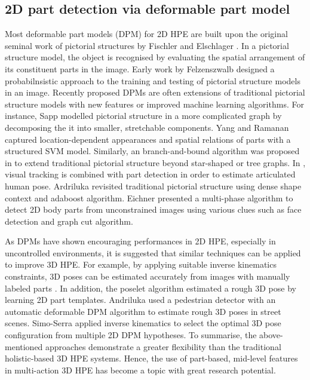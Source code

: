\subsection{2D part detection via deformable part model}  
Most deformable part models (DPM) for 2D HPE are built upon the original seminal work of pictorial structures by Fischler and Elschlager \cite{Fischler1981}. 
In a pictorial structure model, the object is recognised by evaluating the spatial arrangement of its constituent parts in the image. 
Early work by Felzenszwalb \etal \cite{Felzenszwalb2000, Felzenszwalb2005} designed a probabilnsistic approach to the training and testing of pictorial structure models in an image.   
Recently proposed DPMs are often extensions of traditional pictorial structure models with new features or improved machine learning algorithms. 
For instance, Sapp \etal \cite{Sapp2011} modelled pictorial structure in a more complicated graph by decomposing the it into smaller, stretchable components. 
Yang and Ramanan \cite{Yang2011} captured location-dependent appearances and spatial relations of parts with a structured SVM model.   
Similarly, an branch-and-bound algorithm was proposed in \cite{Sun2012a} to extend traditional pictorial structure beyond star-shaped or tree graphs. 
In \cite{Hua2007}, visual tracking is combined with part detection in order to estimate articulated human pose. 
Ardriluka \etal \cite{Andriluka2009} revisited traditional pictorial structure using dense shape context and adaboost algorithm. 
Eichner \etal \cite{Eichner2012} presented a multi-phase algorithm to detect 2D body parts from unconstrained images using various clues such as face detection and graph cut algorithm. 

As DPMs have shown encouraging performances in 2D HPE, especially in uncontrolled environments, it is suggested that similar techniques can be applied to improve 3D HPE. 
For example, by applying suitable inverse kinematics constraints, 3D poses can be estimated accurately from images with manually labeled parts \cite{Wei2009, Ramakrishna2012}. 
In addition, the poselet algorithm \cite{Bourdev2009} estimated a rough 3D pose by learning 2D part templates. 
Andriluka \etal \cite{Andriluka2010} used a pedestrian detector with an automatic deformable DPM algorithm to estimate rough 3D poses in street scenes.  
Simo-Serra \etal \cite{Simo-Serra2012} applied inverse kinematics to select the optimal 3D pose configuration from multiple 2D DPM hypotheses.
To summarise, the above-mentioned approaches demonstrate a greater flexibility than the traditional holistic-based 3D HPE systems. Hence, the use of part-based, mid-level features in multi-action 3D HPE has become a topic with great research potential. 

